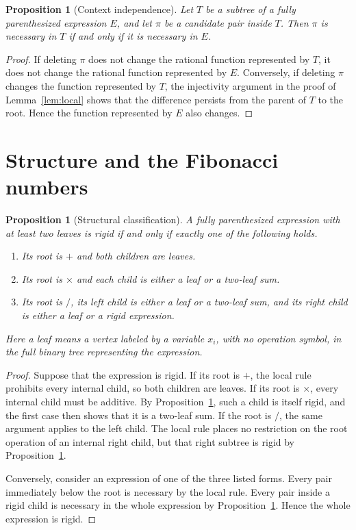 \documentclass[11pt]{article}
\newtheorem{proposition}[theorem]{Proposition}
\begin{document}
\begin{proposition}[Context independence]\label{prop:context}
Let $T$ be a subtree of a fully parenthesized expression $E$, and let $\pi$ be
a candidate pair inside $T$. Then $\pi$ is necessary in $T$ if and only if it
is necessary in $E$.
\end{proposition}

\begin{proof}
If deleting $\pi$ does not change the rational function represented by $T$,
it does not change the rational function represented by $E$. Conversely, if
deleting $\pi$ changes the function represented by $T$, the injectivity
argument in the proof of Lemma~\ref{lem:local} shows that the difference
persists from the parent of $T$ to the root. Hence the function represented by
$E$ also changes.
\end{proof}

\section{Structure and the Fibonacci numbers}

\begin{proposition}[Structural classification]\label{prop:structure}
A fully parenthesized expression with at least two leaves is rigid if and only
if exactly one of the following holds.
\begin{enumerate}
\item Its root is $+$ and both children are leaves.
\item Its root is $\times$ and each child is either a leaf or a two-leaf sum.
\item Its root is $/$, its left child is either a leaf or a two-leaf sum, and
      its right child is either a leaf or a rigid expression.
\end{enumerate}

Here a \emph{leaf} means a vertex labeled by a variable $x_i$, with no
operation symbol, in the full binary tree representing the expression.
\end{proposition}

\begin{proof}
Suppose that the expression is rigid. If its root is $+$, the local rule
prohibits every internal child, so both children are leaves. If its root is
$\times$, every internal child must be additive. By
Proposition~\ref{prop:context}, such a child is itself rigid, and the first
case then shows that it is a two-leaf sum. If the root is $/$, the same
argument applies to the left child. The local rule places no restriction on
the root operation of an internal right child, but that right subtree is rigid
by Proposition~\ref{prop:context}.

Conversely, consider an expression of one of the three listed forms. Every
pair immediately below the root is necessary by the local rule. Every pair
inside a rigid child is necessary in the whole expression by
Proposition~\ref{prop:context}. Hence the whole expression is rigid.
\end{proof}
\end{document}
